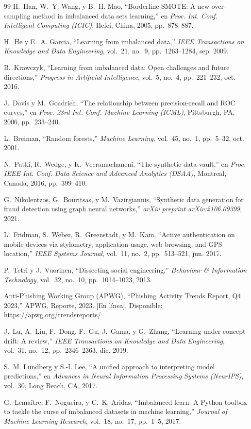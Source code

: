 \documentclass[journal]{IEEEtran}
\begin{document}
\begin{thebibliography}{99}
H.~Han, W.~Y. Wang, y B.~H. Mao,
``Borderline-SMOTE: A new over-sampling method in imbalanced data sets
learning,''
en \textit{Proc. Int. Conf. Intelligent Computing (ICIC)}, Hefei, China,
2005, pp.~878--887.

H.~He y E.~A. Garcia,
``Learning from imbalanced data,''
\textit{IEEE Transactions on Knowledge and Data Engineering}, vol.~21, no.~9,
pp.~1263--1284, sep. 2009.

B.~Krawczyk,
``Learning from imbalanced data: Open challenges and future directions,''
\textit{Progress in Artificial Intelligence}, vol.~5, no.~4, pp.~221--232,
oct. 2016.

J.~Davis y M.~Goadrich,
``The relationship between precision-recall and ROC curves,''
en \textit{Proc. 23rd Int. Conf. Machine Learning (ICML)}, Pittsburgh, PA,
2006, pp.~233--240.

L.~Breiman,
``Random forests,''
\textit{Machine Learning}, vol.~45, no.~1, pp.~5--32, oct. 2001.

N.~Patki, R.~Wedge, y K.~Veeramachaneni,
``The synthetic data vault,''
en \textit{Proc. IEEE Int. Conf. Data Science and Advanced Analytics (DSAA)},
Montreal, Canada, 2016, pp.~399--410.

G.~Nikolentzos, G.~Bouritsas, y M.~Vazirgiannis,
``Synthetic data generation for fraud detection using graph neural networks,''
\textit{arXiv preprint arXiv:2106.09399}, 2021.

L.~Fridman, S.~Weber, R.~Greenstadt, y M.~Kam,
``Active authentication on mobile devices via stylometry, application usage,
web browsing, and GPS location,''
\textit{IEEE Systems Journal}, vol.~11, no.~2, pp.~513--521, jun. 2017.

P.~Tetri y J.~Vuorinen,
``Dissecting social engineering,''
\textit{Behaviour \& Information Technology}, vol.~32, no.~10, pp.~1014--1023,
2013.

Anti-Phishing Working Group (APWG),
``Phishing Activity Trends Report, Q4 2023,''
APWG, Reporte, 2023.
[En línea]. Disponible: \url{https://apwg.org/trendsreports/}

J.~Lu, A.~Liu, F.~Dong, F.~Gu, J.~Gama, y G.~Zhang,
``Learning under concept drift: A review,''
\textit{IEEE Transactions on Knowledge and Data Engineering}, vol.~31, no.~12,
pp.~2346--2363, dic. 2019.

S.~M. Lundberg y S.-I. Lee,
``A unified approach to interpreting model predictions,''
en \textit{Advances in Neural Information Processing Systems (NeurIPS)},
vol.~30, Long Beach, CA, 2017.

G.~Lema\^{i}tre, F.~Nogueira, y C.~K. Aridas,
``Imbalanced-learn: A Python toolbox to tackle the curse of imbalanced
datasets in machine learning,''
\textit{Journal of Machine Learning Research}, vol.~18, no.~17, pp.~1--5,
2017.

\end{thebibliography}
\end{document}

